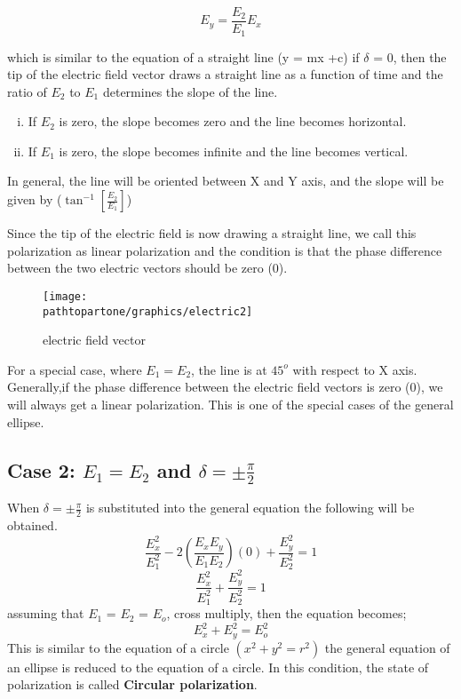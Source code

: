 \begin{equation}
E_y = \frac{E_2}{E_1}E_x
\end{equation}

which is similar to the equation of a straight line (y = mx +c)
if $\delta$ = 0, then the tip of the electric field vector draws a straight line as a function of time and the ratio of $ E_2 $ to $ E_1 $ determines the slope of the line.
\begin{enumerate}[(i)]
\item If $ E_2 $ is zero, the slope becomes zero and the line becomes horizontal.
\item If $ E_1 $ is zero, the slope becomes infinite and the line becomes vertical.
\end{enumerate} 
In general, the line will be oriented between X and Y axis, and the slope will be given by ($ \tan^{-1}[\frac{E_2}{E_1}]$)

Since the tip of the electric field is now drawing a straight line, we call this polarization as linear polarization and the condition is that the phase difference between the two electric vectors should be zero (0).
\begin{figure}[h]
\centering
\texttt{[image: \\pathtopartone/graphics/electric2]}
\caption{electric field vector}
\end{figure}

For a special case, where $  E_1=E_2 $, the line is at $ 45^{o}$ with respect to X axis.
Generally,if the phase difference between the electric field vectors is zero (0), we will always get a linear polarization. This is one of the special cases of the general ellipse.

\subsection{Case 2: $ E_1 = E_2 $ and $\delta = \pm \frac{\pi}{2}$}
When $\delta = \pm \frac{\pi}{2}$ is substituted into the general equation the following will be obtained.
\begin{equation}
\frac{E_{x}^2}{E_{1}^2} -2(\frac{E_{x}E_{y}}{E_{1}E_{2}})(0) + \frac{E_{y}^2}{E_{2}^2} = 1
\end{equation}
\begin{equation}
\frac{E_{x}^2}{E_{1}^2} + \frac{E_{y}^2}{E_{2}^2} = 1
\end{equation}
assuming that $ E_1 $ = $ E_2 $ = $ E_{o} $, cross multiply, then the equation becomes;
\begin{equation}
{E_{x}^2} + {E_{y}^2} = {E_{o}^2}
\end{equation}
This is similar to the equation of a circle $(x^2 + y^2 = r^2)$ the general equation of an ellipse is reduced to the equation of a circle. In this condition, the state of polarization is called \textbf{Circular polarization}.

